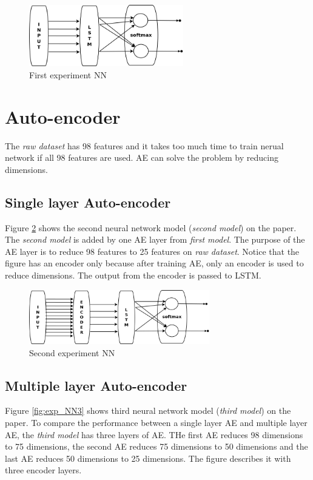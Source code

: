 \documentclass[draft,dvipsnames]{drexel-thesis}
\begin{document}
\begin{thesis}
\begin{figure}[t!]
    \centering
    \includegraphics[width=0.6\textwidth]{pictures/figures/exp_NN1.png}
    \caption{First experiment NN}
    \label{fig:exp_NN1}
\end{figure}


\section{Auto-encoder}
The {\em raw dataset} has 98 features and it takes too much time to train nerual network if all 98 features are used. AE can solve the problem by reducing dimensions.

\subsection{Single layer Auto-encoder}
Figure \ref{fig:exp_NN2} shows the second neural network model ({\em second model}) on the paper. The {\em second model} is added by one AE layer from {\em first model}. The purpose of the AE layer is to reduce 98 features to 25 features on {\em raw dataset}. Notice that the figure has an encoder only because after training AE, only an encoder is used to reduce dimensions. The output from the encoder is passed to LSTM.

\begin{figure}[t!]
    \centering
    \includegraphics[width=0.7\textwidth]{pictures/figures/exp_NN2.png}
    \caption{Second experiment NN}
    \label{fig:exp_NN2}
\end{figure}


\subsection{Multiple layer Auto-encoder}
Figure \ref{fig:exp_NN3} shows third neural network model ({\em third model}) on the paper. To compare the performance between a single layer AE and multiple layer AE, the {\em third model} has three layers of AE.  THe first AE reduces 98 dimensions to 75 dimensions, the second AE reduces 75 dimensions to 50 dimensions and the last AE reduces 50 dimensions to 25 dimensions. The figure describes it with three encoder layers.


\end{thesis}
\end{document}
